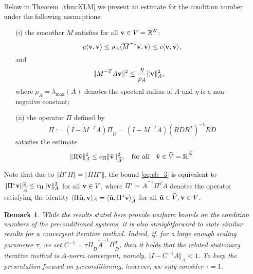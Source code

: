 \documentclass[11pt]{amsart}
\numberwithin{equation}{section}
\newtheorem{remark}{Remark}[section]
\theoremstyle{definition}\newtheorem{example}{Example}[section]
\begin{document}
Below in Theorem~\ref{thm:KLM}
we present an estimate for the condition number under the following assumptions:
\begin{itemize}
\item[(i)] the smoother $M$ satisfies
for all ${{\bf{{v}}}} \in V={{\mathbb{R}}^{{N}}}$: 
\begin{equation}\label{eq:eb_1}
\underbar{$c$}\langle{{\bf{{v}}}},{{\bf{{v}}}}\rangle \le \rho_A \langle \overline{M}^{-1}{{\bf{{v}}}},{{\bf{{v}}}}\rangle
\le \bar{c}\langle{{\bf{{v}}}},{{\bf{{v}}}}\rangle, 
\end{equation}
and 
\begin{equation}\label{eq:eb_2}
 \Vert M^{-T} A {{\bf{{v}}}}\Vert^2\le \frac{\eta}{\rho_A}\Vert {{\bf{{v}}}} \Vert_A^2, \quad 
\end{equation}
where $\rho_A=\lambda_{\max}(A)$ denotes the spectral radius of $A$
and $\eta$ is  a non-negative constant;\\
\item[(ii)] the operator $\Pi$ defined by
\begin{equation}\label{eq:two-grid_4}
\Pi:=(I-M^{-T} A)\Pi_{\widetilde{D}}=
(I-M^{-T} A)(R\widetilde{D}R^T)^{-1}R\widetilde{D}
\end{equation}
satisfies the estimate
\begin{equation}\label{eq:eb_3}
\Vert \Pi \tilde{{{\bf{{v}}}}}\Vert_A^2\le c_{\Pi} 
\Vert \tilde{{{\bf{{v}}}}}\Vert_{\widetilde{A}}^2, \quad 
\mbox{for all}\quad \tilde{{{\bf{{v}}}}}\in \widetilde{V}={{\mathbb{R}}^{{\widetilde{N}}}}. 
\end{equation}
\end{itemize}
Note that due to $\Vert\Pi^{\star}\Pi\Vert=\Vert\Pi\Pi^{\star}\Vert$, the bound \eqref{eq:eb_3} 
is equivalent to
$\Vert \Pi^{\star} {{\bf{{v}}}}\Vert_{\widetilde{A}}^2\le c_{\Pi} \Vert {{\bf{{v}}}}\Vert_{A}^2$ 
for all ${{\bf{{v}}}}\in V$, where $\Pi^{\star}=\widetilde{A}^{-1}\Pi^T A$
denotes the operator satisfying the identity
$\langle \Pi \tilde{{{\bf{{u}}}}},{{\bf{{v}}}}\rangle_A = \langle\tilde{{{\bf{{u}}}}},\Pi^{\star}{{\bf{{v}}}} 
\rangle_{\widetilde{A}}$ for all $\tilde{{{\bf{{u}}}}} \in \widetilde{V}, {{\bf{{v}}}}\in V$.

\begin{remark}
While the results stated here provide uniform bounds on the condition
numbers of the preconditioned systems, it is also straightforward to
state similar results for a convergent iterative method. Indeed, 
if, for a large enough scaling parameter $\tau$,  we set 
$
C^{-1}=\tau \Pi_{\widetilde{D}} \widetilde{A}^{-1}
\Pi^T_{\widetilde{D}}$, then 
it holds that the related stationary iterative method is $A$-norm
convergent, namely,  $\Vert I-C^{-1}A\Vert_A < 1$. To keep the
presentation focused on preconditioning, however, we only consider
$\tau=1$. 
\end{remark}
\end{document}
